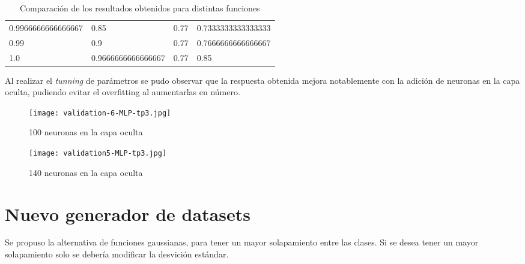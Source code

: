\documentclass{article}
\begin{document}
\begin{table}[h]
{\begin{tabular}{llll}
0.9966666666666667                                                                            & 0.85                                                                                    & 0.77                                                                                             & 0.7333333333333333                                                                           \\
0.99                                                                                          & 0.9                                                                                     & 0.77                                                                                             & 0.7666666666666667                                                                           \\
1.0                                                                                           & 0.9666666666666667                                                                      & 0.77                                                                                             & 0.85                                                                              
\end{tabular}}
\caption{Comparación de los resultados obtenidos para distintas funciones}
\label{tabla:Cuadro comparativo}
\end{table}

Al realizar el \textit{tunning} de parámetros se pudo observar que la respuesta obtenida mejora notablemente con la adición de neuronas en la capa oculta, pudiendo evitar el overfitting al aumentarlas en número.

\begin{figure*}[h]
    \centering
    \begin{subfigure}[b]{0.475\textwidth}
        \centering
        \texttt{[image: validation-6-MLP-tp3.jpg]}
        \caption[]%
        {{\small 100 neuronas en la capa oculta}}    
    \end{subfigure}
    \hfill
    \begin{subfigure}[b]{0.475\textwidth}  
        \centering 
        \texttt{[image: validation5-MLP-tp3.jpg]}
        \caption[]%
        {{\small 140 neuronas en la capa oculta}}    
    \end{subfigure}
    \end{figure*}

\section{Nuevo generador de datasets}
Se propuso la alternativa de funciones gaussianas, para tener un mayor solapamiento entre las clases. Si se desea tener un mayor solapamiento solo se debería modificar la desvición estándar.
\end{document}
